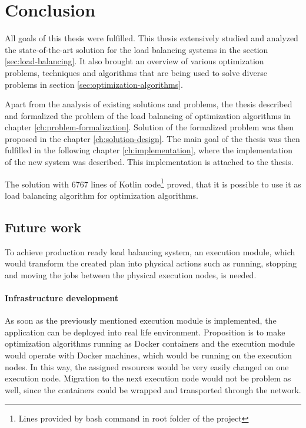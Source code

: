 \chapter{Conclusion}\label{ch:conclusion}
All goals of this thesis were fulfilled.
This thesis extensively studied 
and analyzed the state-of-the-art solution for the load balancing systems in the section \ref{sec:load-balancing}. 
It also brought an overview of various optimization problems, techniques and algorithms 
that are being used to solve diverse problems in section \ref{sec:optimization-algorithms}.

Apart from the analysis of existing solutions and problems,
the thesis described and formalized the problem of the load balancing of optimization algorithms in chapter \ref{ch:problem-formalization}.
Solution of the formalized problem was then proposed in the chapter \ref{ch:solution-design}.
The main goal of the thesis was then fulfilled in the following chapter \ref{ch:implementation},
where the implementation of the new system was described.
This implementation is attached to the thesis.

The solution with 6767 lines of Kotlin 
code\footnote{Lines provided by  bash command in root folder of the project} 
proved, that it is possible to use it as load balancing algorithm for optimization algorithms.

\section{Future work}\label{sec:future-work}
To achieve production ready load balancing system,
an execution module, 
which would transform the created plan into physical actions 
such as running, stopping and moving the jobs between the physical execution nodes,
is needed.

\subsubsection{Infrastructure development}
As soon as the previously mentioned execution module is implemented,
the application can be deployed into real life environment.
Proposition is to make optimization algorithms running as Docker containers 
and the execution module would operate with Docker machines,
which would be running on the execution nodes. 
In this way, 
the assigned resources would be very easily changed on one execution node.
Migration to the next execution node would not be problem as well, 
since the containers could be wrapped and transported through the network.

